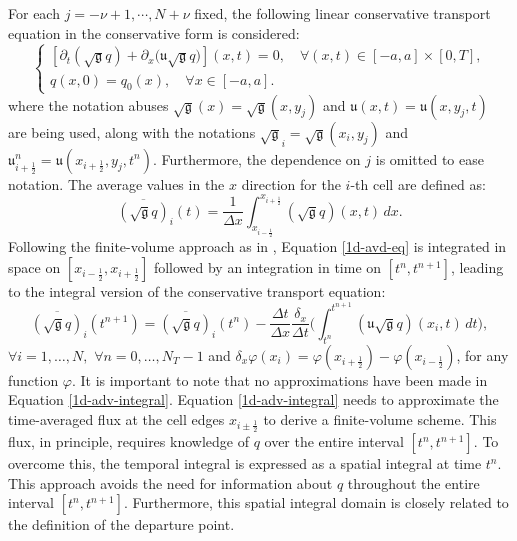 \documentclass[preprint,12pt]{elsarticle}
\begin{document}
\begin{linenumbers}
For each $j=-\nu+1, \cdots, N+\nu$ fixed, the following linear conservative transport equation in the conservative form is considered:
\begin{equation}
	\label{1d-avd-eq}
	\begin{cases}
		[{\partial_t (\sqrt{\mathfrak{g}} {q})} + {\partial_x (\mathfrak{u}\sqrt{\mathfrak{g}}{q}})](x, t)
		= 0, \quad \forall (x,t) \in [-a, a]\times [0,T],\\
		q(x,0) = q_0(x), \quad \forall x \in [-a, a].
	\end{cases}
\end{equation}
where the notation abuses $\sqrt{\mathfrak{g}}(x) = \sqrt{\mathfrak{g}}(x,y_j)$ and $\mathfrak{u}(x,t) = \mathfrak{u}(x,y_j,t)$ are being used, along with the notations $\sqrt{\mathfrak{g}}_i = \sqrt{\mathfrak{g}}(x_i,y_j)$ and ${\mathfrak{u}}_{i+\frac{1}{2}}^n = {\mathfrak{u}}(x_{i+\frac{1}{2}},y_j,t^n)$.
Furthermore, the dependence on $j$ is omitted to ease notation.
The average values in the $x$ direction for the $i$-th cell are defined as:
\begin{equation}
	\label{1d-average-def}
	\overline{(\sqrt{\mathfrak{g}}q)}_{i}(t) = \frac{1}{\Delta x} \int_{x_{i-\frac{1}{2}}}^{x_{i+\frac{1}{2}}} {(\sqrt{\mathfrak{g}}q)}(x,t) \,dx.
\end{equation}
Following the finite-volume approach as in \cite{leveque:1990},
Equation \eqref{1d-avd-eq} is integrated in space on 
$[x_{i-\frac{1}{2}},x_{i+\frac{1}{2}}]$
followed by an integration in time on $[t^{n},t^{n+1}]$, leading to the integral version of the conservative transport equation:
\begin{equation}
	\label{1d-adv-integral}
	\overline{(\sqrt{\mathfrak{g}}q)}_i(t^{n+1}) =  \overline{(\sqrt{\mathfrak{g}}q)}_i(t^{n}) -
	\frac{\Delta t}{\Delta x}
	\frac{\delta_x}{\Delta t}\bigg(
	\int_{t^{n}}^{t^{n+1}}
	{(\mathfrak{u}{\sqrt{\mathfrak{g}}q})}(x_i, t) \,dt \bigg),
\end{equation}
$ \forall i = 1, \ldots, N,$ $\forall n = 0, \ldots, N_T-1$
and $\delta_x \varphi(x_i) = \varphi(x_{i+\frac{1}{2}})-\varphi(x_{i-\frac{1}{2}})$, for any function $\varphi$.
It is important to note that no approximations have been made in Equation \eqref{1d-adv-integral}. 
Equation \eqref{1d-adv-integral} needs to approximate the time-averaged flux at the cell edges $x_{i\pm\frac{1}{2}}$
to derive a finite-volume scheme. This flux, in principle, requires knowledge of $q$ over the entire interval $[t^n, t^{n+1}]$. 
To overcome this, the temporal integral is expressed as a spatial integral at time $t^n$. 
This approach avoids the need for information about $q$ throughout the entire interval $[t^n, t^{n+1}]$. 
Furthermore, this spatial integral domain is closely related to the definition of the departure point. 


\end{linenumbers}
\end{document}
